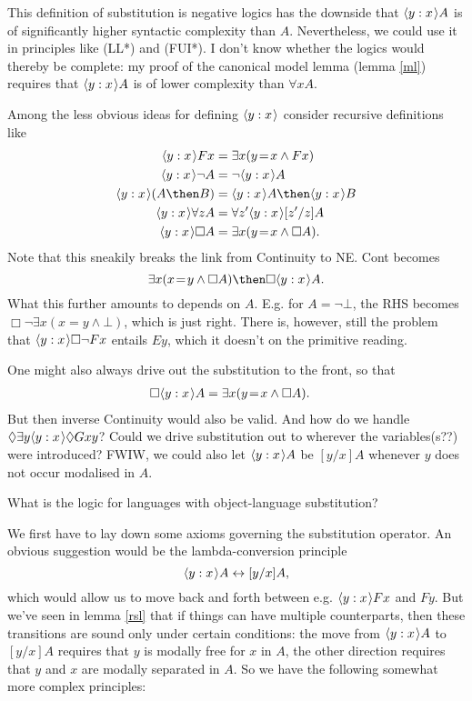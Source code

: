 \documentclass[11pt]{woarticle}
\theoremstyle{break}
\theoremstyle{nonumberplain}
\newcommand{\1}{\;\,|\;\,}
\newcommand{\falsum}{\bot}
\renewcommand{\t}[1]{\ensuremath{\langle #1  \makebox[.2ex]{}\rangle}}
\begin{document}
{  This definition of substitution is negative logics has the downside
  that $\t{y:x}A$ is of significantly higher syntactic complexity than
  $A$. Nevertheless, we could use it in principles like (LL*) and
  (FUI*). I don't know whether the logics would thereby be complete:
  my proof of the canonical model lemma (lemma \ref{ml}) requires that
  $\t{y:x}A$ is of lower complexity than $\forall x A$.

  Among the less obvious ideas for defining $\t{y:x}$ consider
  recursive definitions like
  \begin{align*}
    \t{y:x}Fx &= \exists x(y\!=\!x \land Fx)\\
    \t{y:x}\neg A &= \neg \t{y:x}A\\
    \t{y:x}(A \then B) &= \t{y:x}A \then \t{y:x}B\\
    \t{y:x}\forall z A &= \forall z'\t{y:x}[z'/z]A\\
    \t{y:x}\Box A &= \exists x(y\!=\!x \land \Box A).
  \end{align*}
  Note that this sneakily breaks the link from Continuity to NE. Cont
  becomes
  \[
  \exists x(x\!=\!y \land \Box A) \then \Box\t{y:x}A.
  \]
  What this further amounts to depends on $A$. E.g. for $A = \neg
  \falsum$, the RHS becomes $\Box\neg \exists x(x\!=\!y \land
  \falsum)$, which is just right. There is, however, still the problem
  that $\t{y:x}\Box \neg Fx$ entails $Ey$, which it doesn't on the
  primitive reading.

  One might also always drive out the substitution to the front, so that
  \begin{align*}
    \Box\t{y:x}A &= \exists x(y\!=\!x \land \Box A).
  \end{align*}
  But then inverse Continuity would also be valid. And how do we
  handle $\Diamond\exists y \t{y:x}\Diamond Gxy$? Could we drive
  substitution out to wherever the variables(s??) were introduced?
  FWIW, we could also let $\t{y:x}A$ be $[y/x]A$ whenever $y$ does not
  occur modalised in $A$.

}

What is the logic for languages with object-language substitution?

We first have to lay down some axioms governing the substitution operator. An
obvious suggestion would be the lambda-conversion principle
\[
   \t{y:x}A \leftrightarrow [y/x]A,
\]
which would allow us to move back and forth between e.g. $\t{y:x}Fx$
and $Fy$. But we've seen in lemma \ref{rsl} that if things can have
multiple counterparts, then these transitions are sound only under
certain conditions: the move from $\t{y:x}A$ to $[y/x]A$ requires that
$y$ is modally free for $x$ in $A$, the other direction requires that
$y$ and $x$ are modally separated in $A$. So we have the following
somewhat more complex principles:
\end{document}
